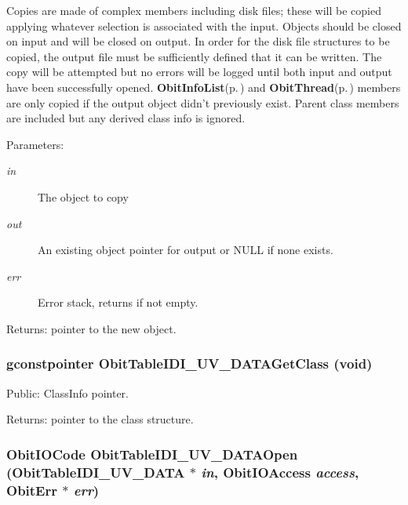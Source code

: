 Copies are made of complex members including disk files; these will be copied applying whatever selection is associated with the input. Objects should be closed on input and will be closed on output. In order for the disk file structures to be copied, the output file must be sufficiently defined that it can be written. The copy will be attempted but no errors will be logged until both input and output have been successfully opened. {\bf Obit\-Info\-List}{\rm (p.\,\pageref{structObitInfoList})} and {\bf Obit\-Thread}{\rm (p.\,\pageref{structObitThread})} members are only copied if the output object didn't previously exist. Parent class members are included but any derived class info is ignored. \begin{Desc}
\item[Parameters:]
\begin{description}
\item[{\em in}]The object to copy \item[{\em out}]An existing object pointer for output or NULL if none exists. \item[{\em err}]Error stack, returns if not empty. \end{description}
\end{Desc}
\begin{Desc}
\item[Returns:]pointer to the new object. \end{Desc}
\subsubsection{\setlength{\rightskip}{0pt plus 5cm}gconstpointer Obit\-Table\-IDI\_\-UV\_\-DATAGet\-Class (void)}\label{ObitTableIDI__UV__DATA_8h_a13}


Public: Class\-Info pointer. 

\begin{Desc}
\item[Returns:]pointer to the class structure. \end{Desc}
\subsubsection{\setlength{\rightskip}{0pt plus 5cm}Obit\-IOCode Obit\-Table\-IDI\_\-UV\_\-DATAOpen ({\bf Obit\-Table\-IDI\_\-UV\_\-DATA} $\ast$ {\em in}, Obit\-IOAccess {\em access}, {\bf Obit\-Err} $\ast$ {\em err})}\label{ObitTableIDI__UV__DATA_8h_a17}


